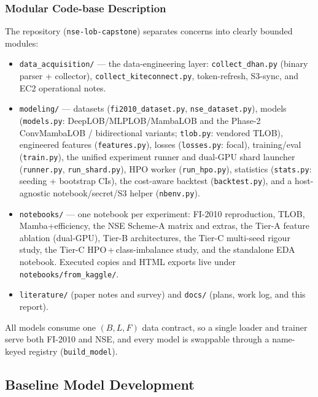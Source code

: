 \documentclass[11pt]{article}
\begin{document}
\subsubsection{Modular Code-base Description}
The repository (\texttt{nse-lob-capstone}) separates concerns into clearly bounded modules:
\begin{itemize}[nosep]
  \item \texttt{data\_acquisition/} --- the data-engineering layer: \texttt{collect\_dhan.py} (binary parser
        + collector), \texttt{collect\_kiteconnect.py}, token-refresh, S3-sync, and EC2 operational notes.
  \item \texttt{modeling/} --- datasets (\texttt{fi2010\_dataset.py}, \texttt{nse\_dataset.py}), models
        (\texttt{models.py}: DeepLOB/MLPLOB/MambaLOB and the Phase-2 ConvMambaLOB / bidirectional variants;
        \texttt{tlob.py}: vendored TLOB), engineered features (\texttt{features.py}), losses
        (\texttt{losses.py}: focal), training/eval (\texttt{train.py}), the unified experiment runner and
        dual-GPU shard launcher (\texttt{runner.py}, \texttt{run\_shard.py}), HPO worker
        (\texttt{run\_hpo.py}), statistics (\texttt{stats.py}: seeding + bootstrap CIs), the cost-aware
        backtest (\texttt{backtest.py}), and a host-agnostic notebook/secret/S3 helper (\texttt{nbenv.py}).
  \item \texttt{notebooks/} --- one notebook per experiment: FI-2010 reproduction, TLOB, Mamba+efficiency,
        the NSE Scheme-A matrix and extras, the Tier-A feature ablation (dual-GPU), Tier-B architectures,
        the Tier-C multi-seed rigour study, the Tier-C HPO\,+\,class-imbalance study, and the standalone EDA
        notebook. Executed copies and HTML exports live under \texttt{notebooks/from\_kaggle/}.
  \item \texttt{literature/} (paper notes and survey) and \texttt{docs/} (plans, work log, and this report).
\end{itemize}
All models consume one $(B,L,F)$ data contract, so a single loader and trainer serve both FI-2010 and NSE,
and every model is swappable through a name-keyed registry (\texttt{build\_model}).

\subsection{Baseline Model Development}
\end{document}
